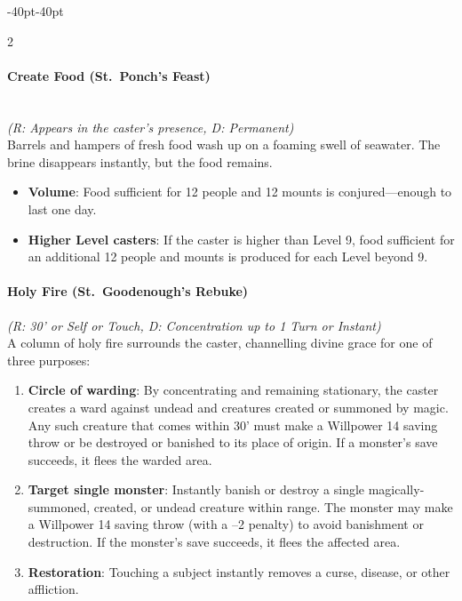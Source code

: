 \documentclass{book}
\providecommand{\tightlist}{%
\setlength{\itemsep}{0pt}\setlength{\parskip}{0pt}}
\begin{document}
\begin{adjustwidth}{-40pt}{-40pt}
\begin{multicols}{2}
\paragraph{Create Food (St.~Ponch's
	Feast)}\label{create-food-st.-ponchs-feast}\mbox{}\\
\emph{(R: Appears in the caster's presence, D: Permanent)}\\
Barrels and hampers of fresh food wash up on a foaming swell of
seawater. The brine disappears instantly, but the food remains.

\begin{itemize}
	\tightlist
	\item
	\textbf{Volume}: Food sufficient for 12 people and 12 mounts is
	conjured---enough to last one day.
	\item
	\textbf{Higher Level casters}: If the caster is higher than Level 9,
	food sufficient for an additional 12 people and mounts is produced for
	each Level beyond 9.
\end{itemize}

\paragraph{Holy Fire (St.~Goodenough's
	Rebuke)}\label{holy-fire-st.-goodenoughs-rebuke}

\emph{(R: 30' or Self or Touch, D: Concentration up to 1 Turn or
	Instant)}\\
A column of holy fire surrounds the caster, channelling divine grace for
one of three purposes:

\begin{enumerate}
	\def\labelenumi{\arabic{enumi}.}
	\tightlist
	\item
	\textbf{Circle of warding}: By concentrating and remaining stationary,
	the caster creates a ward against undead and creatures created or
	summoned by magic. Any such creature that comes within 30' must make a
	Willpower 14 saving throw or be destroyed or banished to its place of
	origin. If a monster's save succeeds, it flees the warded area.
	\item
	\textbf{Target single monster}: Instantly banish or destroy a single
	magically-summoned, created, or undead creature within range. The
	monster may make a Willpower 14 saving throw (with a --2 penalty) to
	avoid banishment or destruction. If the monster's save succeeds, it
	flees the affected area.
	\item
	\textbf{Restoration}: Touching a subject instantly removes a curse,
	disease, or other affliction.
\end{enumerate}


\end{multicols}
\end{adjustwidth}
\end{document}
